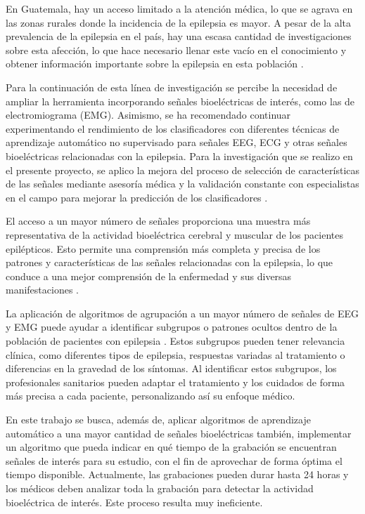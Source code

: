 En Guatemala, hay un acceso limitado a la atención médica, lo que se agrava en las zonas rurales donde la incidencia de la epilepsia es mayor. A pesar de la alta prevalencia de la epilepsia en el país, hay una escasa cantidad de investigaciones sobre esta afección, lo que hace necesario llenar este vacío en el conocimiento y obtener información importante sobre la epilepsia en esta población \cite{mendizabal1996prevalence}.

Para la continuación de esta línea de investigación se percibe la necesidad de ampliar la herramienta incorporando señales bioeléctricas de interés, como las de electromiograma (EMG). Asimismo, se ha recomendado continuar experimentando el rendimiento de los clasificadores con diferentes técnicas de aprendizaje automático no supervisado para señales EEG, ECG y otras señales bioeléctricas relacionadas con la epilepsia. Para la investigación que se realizo en el presente proyecto, se aplico la mejora del proceso de selección de características de las señales mediante asesoría médica y la validación constante con especialistas en el campo para mejorar la predicción de los clasificadores \cite{camila_2022}. 

El acceso a un mayor número de señales proporciona una muestra más representativa de la actividad bioeléctrica cerebral y muscular de los pacientes epilépticos. Esto permite una comprensión más completa y precisa de los patrones y características de las señales relacionadas con la epilepsia, lo que conduce a una mejor comprensión de la enfermedad y sus diversas manifestaciones \cite{rouhiainen2018inteligencia}.

La aplicación de algoritmos de agrupación a un mayor número de señales de EEG y EMG puede ayudar a identificar subgrupos o patrones ocultos dentro de la población de pacientes con epilepsia \cite{felix2002data}. Estos subgrupos pueden tener relevancia clínica, como diferentes tipos de epilepsia, respuestas variadas al tratamiento o diferencias en la gravedad de los síntomas. Al identificar estos subgrupos, los profesionales sanitarios pueden adaptar el tratamiento y los cuidados de forma más precisa a cada paciente, personalizando así su enfoque médico.

En este trabajo se busca, además de, aplicar algoritmos de aprendizaje automático a una mayor cantidad de señales bioeléctricas también, implementar un algoritmo que pueda indicar en qué tiempo de la grabación se encuentran señales de interés para su estudio, con el fin de aprovechar de forma óptima el tiempo disponible. Actualmente, las grabaciones pueden durar hasta 24 horas y los médicos deben analizar toda la grabación para detectar la actividad bioeléctrica de interés. Este proceso resulta muy ineficiente.

